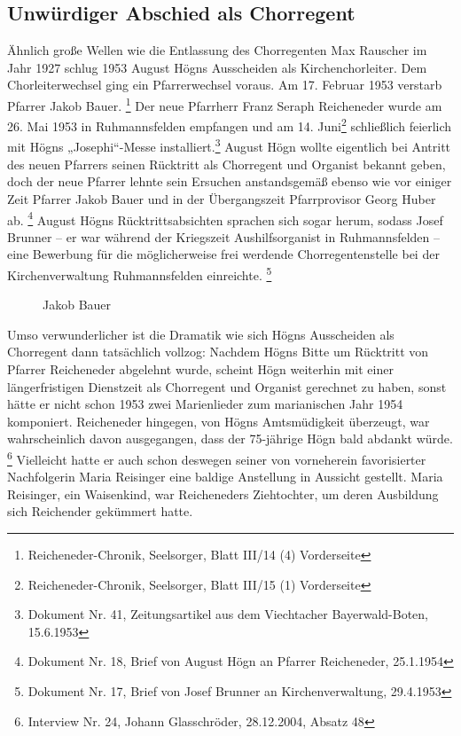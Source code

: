\subsection{Unwürdiger Abschied als Chorregent}

Ähnlich große Wellen wie die
Entlassung des Chorregenten Max Rauscher im Jahr 1927 schlug 1953
August Högns Ausscheiden als Kirchenchorleiter. Dem Chorleiterwechsel
ging ein Pfarrerwechsel voraus. Am 17. Februar 1953 verstarb Pfarrer
Jakob Bauer. \footnote{Reicheneder-Chronik, Seelsorger, Blatt III/14
(4) Vorderseite} Der neue Pfarrherr Franz Seraph Reicheneder wurde am
26. Mai 1953 in Ruhmannsfelden empfangen und am 14. Juni\footnote{
Reicheneder-Chronik, Seelsorger, Blatt III/15 (1) Vorderseite}
schließlich feierlich mit Högns „Josephi“-Messe installiert.\footnote{
Dokument Nr. 41, Zeitungsartikel aus dem Viechtacher Bayerwald-Boten,
15.6.1953} August Högn wollte eigentlich bei Antritt des neuen Pfarrers
seinen Rücktritt als Chorregent und Organist bekannt geben, doch der
neue Pfarrer lehnte sein Ersuchen anstandsgemäß ebenso wie vor einiger
Zeit Pfarrer Jakob Bauer und in der Übergangszeit Pfarrprovisor Georg
Huber ab. \footnote{Dokument Nr. 18, Brief von August Högn an Pfarrer
Reicheneder, 25.1.1954} August Högns Rücktrittsabsichten sprachen sich
sogar herum, sodass Josef Brunner – er war während der Kriegszeit
Aushilfsorganist in Ruhmannsfelden – eine Bewerbung für die
möglicherweise frei werdende Chorregentenstelle bei der
Kirchenverwaltung Ruhmannsfelden einreichte. \footnote{Dokument Nr. 17,
Brief von Josef Brunner an Kirchenverwaltung, 29.4.1953}

\begin{figure}
\caption{Jakob Bauer}
\end{figure}

Umso verwunderlicher ist die Dramatik wie sich Högns Ausscheiden als
Chorregent dann tatsächlich vollzog: Nachdem Högns Bitte um Rücktritt
von Pfarrer Reicheneder abgelehnt wurde, scheint Högn weiterhin mit
einer längerfristigen Dienstzeit als Chorregent und Organist gerechnet
zu haben, sonst hätte er nicht schon 1953 zwei Marienlieder zum
marianischen Jahr 1954 komponiert. Reicheneder hingegen, von Högns
Amtsmüdigkeit überzeugt, war wahrscheinlich davon ausgegangen, dass der
75-jährige Högn bald abdankt würde. \footnote{Interview Nr. 24, Johann
Glasschröder, 28.12.2004, Absatz 48} Vielleicht hatte er auch schon
deswegen seiner von vorneherein favorisierter Nachfolgerin Maria
Reisinger eine baldige Anstellung in Aussicht gestellt. Maria
Reisinger, ein Waisenkind, war Reicheneders Ziehtochter, um deren
Ausbildung sich Reichender gekümmert hatte.

